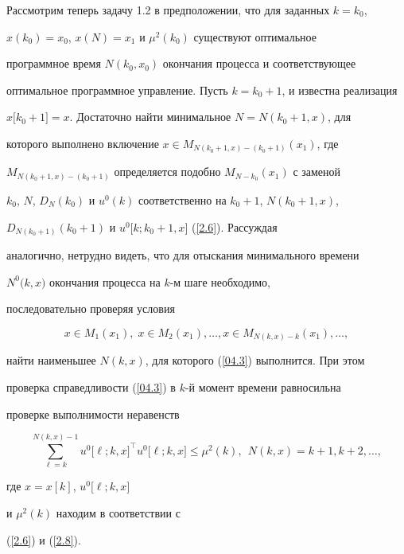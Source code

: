 Рассмотрим теперь задачу 1.2 в предположении, что для заданных $k=k_0$,


$x(k_0)=x_0$, $x(N)=x_1$ и $\mu^2(k_0)$ существуют оптимальное


программное время $N(k_0, x_0)$ окончания процесса и соответствующее


оптимальное программное управление. Пусть $k=k_0+1$, и известна реализация


$x\bigl[k_0+1\bigr]=x$. Достаточно найти минимальное $N=N(k_0+1, x)$, для


которого выполнено включение $x\in M_{N(k_0+1, x)-(k_0+1)}(x_1)$, где


$M_{N(k_0+1, x)-(k_0+1)}$ определяется подобно $M_{N-k_0}(x_1)$ с заменой


$k_0$, $N$, $D_N(k_0)$ и $u^0(k)$ соответственно на $k_0+1$, $N(k_0+1,x)$,


$D_{N(k_0+1)}(k_0+1)$ и $u^0\bigl[k; k_0+1, x\bigr]$ (\ref{2.6}). Рассуждая


аналогично, нетрудно видеть, что для отыскания минимального времени


$N^0\bigl(k, x\bigr)$ окончания процесса на $k$-м шаге необходимо,


последовательно проверяя условия


\begin{equation}\label{04.3}


x\in M_1(x_1),\; x\in M_2(x_1),\dotsc, x\in M_{N(k, x)-k}(x_1),\dotsc,


\end{equation}


найти наименьшее $N(k, x)$, для которого (\ref{04.3}) выполнится. При этом


проверка справедливости (\ref{04.3}) в $k$-й момент времени равносильна


проверке выполнимости неравенств


$$


\sum_{\ell=k}^{N(k, x)-1} u^0\bigl[\ell; k, x\bigr]^{\top}


u^0\bigl[\ell; k, x\bigr]


\le \mu^2(k), \ \ N(k, x)=k+1, k+2,\dotsc,


$$


где $x=x[k]$, $u^0\bigl[\ell; k, x\bigr]$


и $\mu^2(k)$ находим в соответствии с


(\ref{2.6}) и (\ref{2.8}).






